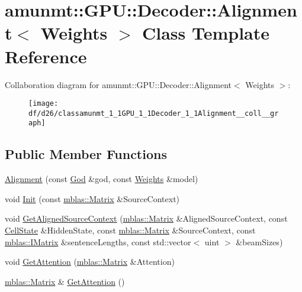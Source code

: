 \hypertarget{classamunmt_1_1GPU_1_1Decoder_1_1Alignment}{}\section{amunmt\+:\+:G\+PU\+:\+:Decoder\+:\+:Alignment$<$ Weights $>$ Class Template Reference}
\label{classamunmt_1_1GPU_1_1Decoder_1_1Alignment}


Collaboration diagram for amunmt\+:\+:G\+PU\+:\+:Decoder\+:\+:Alignment$<$ Weights $>$\+:
\nopagebreak
\begin{figure}[H]
\begin{center}
\leavevmode
\texttt{[image: df/d26/classamunmt\_1\_1GPU\_1\_1Decoder\_1\_1Alignment\_\_coll\_\_graph]}
\end{center}
\end{figure}
\subsection*{Public Member Functions}
\begin{DoxyCompactItemize}
\item 
\hyperlink{classamunmt_1_1GPU_1_1Decoder_1_1Alignment_af47ff2a53bffd4fbba26a3c3947f0163}{Alignment} (const \hyperlink{classamunmt_1_1God}{God} \&god, const \hyperlink{structamunmt_1_1GPU_1_1Weights}{Weights} \&model)
\item 
void \hyperlink{classamunmt_1_1GPU_1_1Decoder_1_1Alignment_a1c314472de493ae8cc1b3a4a2946f437}{Init} (const \hyperlink{namespaceamunmt_1_1GPU_1_1mblas_ab67821a8254de53e45a623cf73c0aef6}{mblas\+::\+Matrix} \&Source\+Context)
\item 
void \hyperlink{classamunmt_1_1GPU_1_1Decoder_1_1Alignment_aca6a7ea06e3db456c9cf723cb62a975f}{Get\+Aligned\+Source\+Context} (\hyperlink{namespaceamunmt_1_1GPU_1_1mblas_ab67821a8254de53e45a623cf73c0aef6}{mblas\+::\+Matrix} \&Aligned\+Source\+Context, const \hyperlink{structamunmt_1_1GPU_1_1CellState}{Cell\+State} \&Hidden\+State, const \hyperlink{namespaceamunmt_1_1GPU_1_1mblas_ab67821a8254de53e45a623cf73c0aef6}{mblas\+::\+Matrix} \&Source\+Context, const \hyperlink{namespaceamunmt_1_1GPU_1_1mblas_ad6a337d269d1833a6028b8871e57d2d0}{mblas\+::\+I\+Matrix} \&sentence\+Lengths, const std\+::vector$<$ uint $>$ \&beam\+Sizes)
\item 
void \hyperlink{classamunmt_1_1GPU_1_1Decoder_1_1Alignment_aed7d728b2215ca90b3bdbda2a4eee4b3}{Get\+Attention} (\hyperlink{namespaceamunmt_1_1GPU_1_1mblas_ab67821a8254de53e45a623cf73c0aef6}{mblas\+::\+Matrix} \&Attention)
\item 
\hyperlink{namespaceamunmt_1_1GPU_1_1mblas_ab67821a8254de53e45a623cf73c0aef6}{mblas\+::\+Matrix} \& \hyperlink{classamunmt_1_1GPU_1_1Decoder_1_1Alignment_a4636a760faa3cfb514d206a5edb753d7}{Get\+Attention} ()
\end{DoxyCompactItemize}
